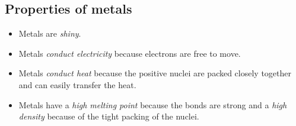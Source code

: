 \subsection*{Properties of metals}
\begin{itemize}[noitemsep]
 \item Metals are \textsl{shiny}.
\item Metals \textsl{conduct electricity} because electrons are free to move.
\item Metals \textsl{conduct heat} because the positive nuclei are packed closely together and can easily transfer the heat.
\item Metals have a \textsl{high melting point} because the bonds are strong and a \textsl{high density} because of the tight packing of the nuclei.
\end{itemize}

